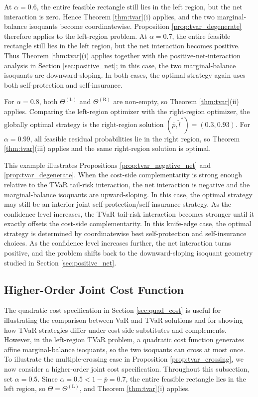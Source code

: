\documentclass[a4paper,12pt]{article}
\begin{document}
At $\alpha=0.6$, the entire feasible rectangle still lies in the left region, but the net interaction is zero. Hence Theorem \ref{thm:tvar}(i) applies, and the two marginal-balance isoquants become coordinatewise. Proposition \ref{prop:tvar_degenerate} therefore applies to the left-region problem. At $\alpha=0.7$, the entire feasible rectangle still lies in the left region, but the net interaction becomes positive. Thus Theorem \ref{thm:tvar}(i) applies together with the positive-net-interaction analysis in Section \ref{sec:positive_net}; in this case, the two marginal-balance isoquants are downward-sloping. In both cases, the optimal strategy again uses both self-protection and self-insurance.

For $\alpha=0.8$, both $\Theta^{\left(\text{L}\right)}$ and $\Theta^{\left(\text{R}\right)}$ are non-empty, so Theorem \ref{thm:tvar}(ii) applies. Comparing the left-region optimizer with the right-region optimizer, the globally optimal strategy is the right-region solution \(\left(\overline{p},\tilde {l}^*\right)=\left(0.3,0.93\right)\). For \(\alpha=0.99\), all feasible residual probabilities lie in the right region, so Theorem \ref{thm:tvar}(iii) applies and the same right-region solution is optimal.

This example illustrates Propositions \ref{prop:tvar_negative_net} and \ref{prop:tvar_degenerate}. When the cost-side complementarity is strong enough relative to the TVaR tail-risk interaction, the net interaction is negative and the marginal-balance isoquants are upward-sloping. In this case, the optimal strategy may still be an interior joint self-protection/self-insurance strategy. As the confidence level increases, the TVaR tail-risk interaction becomes stronger until it exactly offsets the cost-side complementarity. In this knife-edge case, the optimal strategy is determined by coordinatewise best self-protection and self-insurance choices. As the confidence level increases further, the net interaction turns positive, and the problem shifts back to the downward-sloping isoquant geometry studied in Section \ref{sec:positive_net}.

\subsection{Higher-Order Joint Cost Function}

The quadratic cost specification in Section \ref{sec:quad_cost} is useful for illustrating the comparison between VaR and TVaR solutions and for showing how TVaR strategies differ under cost-side substitutes and complements. However, in the left-region TVaR problem, a quadratic cost function generates affine marginal-balance isoquants, so the two isoquants can cross at most once. To illustrate the multiple-crossing case in Proposition \ref{prop:tvar_crossing}, we now consider a higher-order joint cost specification. Throughout this subsection, set $\alpha=0.5$. Since $\alpha=0.5<1-\overline{p}=0.7$, the entire feasible rectangle lies in the left region, so $\Theta=\Theta^{\left(\text{L}\right)}$, and Theorem \ref{thm:tvar}(i) applies.
\end{document}

